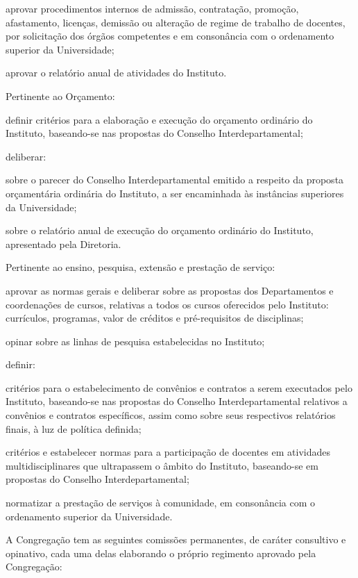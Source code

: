 \documentclass{documento}
\begin{document}
\subinciso aprovar procedimentos internos de admissão, contratação, promoção, afastamento, licenças, demissão ou alteração de regime de trabalho de docentes, por solicitação dos órgãos competentes e em consonância com o ordenamento superior da Universidade;

\subinciso aprovar o relatório anual de atividades do Instituto.

\inciso Pertinente ao Orçamento:

\subinciso definir critérios para a elaboração e execução do orçamento ordinário do Instituto, baseando-se nas propostas do Conselho Interdepartamental;

\subinciso deliberar:

\subsubinciso sobre o parecer do Conselho Interdepartamental emitido a respeito da proposta orçamentária ordinária do Instituto, a ser encaminhada às instâncias superiores da Universidade;

\subsubinciso sobre o relatório anual de execução do orçamento ordinário do Instituto, apresentado pela Diretoria.

\inciso Pertinente ao ensino, pesquisa, extensão e prestação de serviço:

\subinciso aprovar as normas gerais e deliberar sobre as propostas dos Departamentos e coordenações de cursos, relativas a todos os cursos oferecidos pelo Instituto: currículos, programas, valor de créditos e pré-requisitos de disciplinas;

\subinciso opinar sobre as linhas de pesquisa estabelecidas no Instituto;

\subinciso definir: 

\subsubinciso critérios para o estabelecimento de convênios e contratos a serem executados pelo Instituto, baseando-se nas propostas do Conselho Interdepartamental relativos a convênios e contratos específicos, assim como sobre seus respectivos relatórios finais, à luz de política definida;

\subsubinciso critérios e estabelecer normas para a participação de docentes em atividades multidisciplinares que ultrapassem o âmbito do Instituto, baseando-se em propostas do Conselho Interdepartamental;

\subinciso normatizar a prestação de serviços à comunidade, em consonância com o ordenamento superior da Universidade. 


\artigo A Congregação tem as seguintes comissões permanentes, de caráter consultivo e opinativo, cada uma delas elaborando o próprio regimento aprovado pela Congregação:
\end{document}
